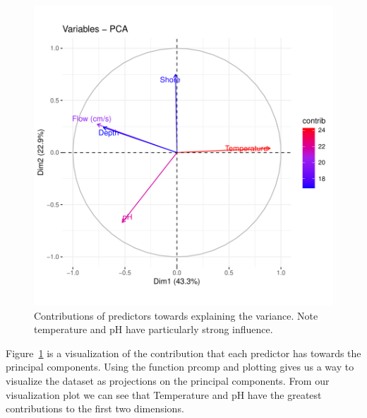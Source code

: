 \begin{figure}[H]
\includegraphics{Chapter5Images/pcaContrib.pdf}
\caption{\hspace{1mm}Contributions of predictors towards explaining the variance. Note temperature and pH have particularly strong influence.}
\label{fig:pcacontrib}
\end{figure}

Figure~\ref{fig:pcacontrib} is a visualization of the contribution that each predictor has towards the principal components. Using the function prcomp and plotting gives us a way to visualize the dataset as projections on the principal components. From our visualization plot we can see that Temperature and pH have the greatest contributions to the first two dimensions.

